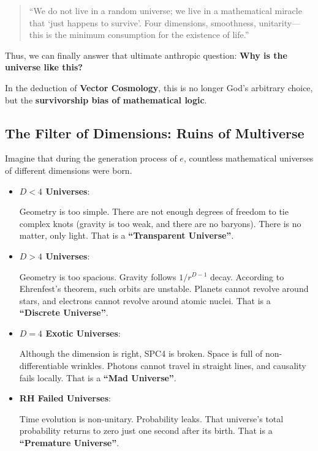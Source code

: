\documentclass[11pt,a4paper,twoside]{book}
\begin{document}
\begin{quote}
``We do not live in a random universe; we live in a mathematical miracle that `just happens to survive'. Four dimensions, smoothness, unitarity—this is the minimum consumption for the existence of life.''
\end{quote}

Thus, we can finally answer that ultimate anthropic question: \textbf{Why is the universe like this?}

In the deduction of \textbf{Vector Cosmology}, this is no longer God's arbitrary choice, but the \textbf{survivorship bias of mathematical logic}.

\subsection{The Filter of Dimensions: Ruins of Multiverse}

Imagine that during the generation process of $e$, countless mathematical universes of different dimensions were born.

\begin{itemize}
\item \textbf{$D < 4$ Universes}:

    Geometry is too simple. There are not enough degrees of freedom to tie complex knots (gravity is too weak, and there are no baryons). There is no matter, only light. That is a \textbf{``Transparent Universe''}.

\item \textbf{$D > 4$ Universes}:

    Geometry is too spacious. Gravity follows $1/r^{D-1}$ decay. According to Ehrenfest's theorem, such orbits are unstable. Planets cannot revolve around stars, and electrons cannot revolve around atomic nuclei. That is a \textbf{``Discrete Universe''}.

\item \textbf{$D = 4$ Exotic Universes}:

    Although the dimension is right, SPC4 is broken. Space is full of non-differentiable wrinkles. Photons cannot travel in straight lines, and causality fails locally. That is a \textbf{``Mad Universe''}.

\item \textbf{RH Failed Universes}:

    Time evolution is non-unitary. Probability leaks. That universe's total probability returns to zero just one second after its birth. That is a \textbf{``Premature Universe''}.
\end{itemize}
\end{document}
